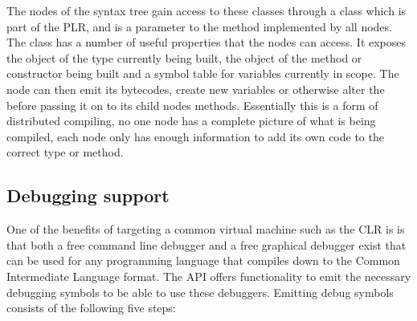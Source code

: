 	The nodes of the syntax tree gain access to these classes through a 
	 class which is part of the PLR, and is a parameter 
	to the  method implemented by all nodes. The 
	 class has a number of useful properties that the 
	nodes can access. It exposes the  object of the type 
	currently being built, the  object of the method or 
	constructor being built and a symbol table for variables currently in scope. 
	The node can then emit its bytecodes, create new variables or otherwise 
	alter the  before passing it on to its child nodes 
	 methods. Essentially this is a form of distributed 
	compiling, no one node has a complete picture of what is being compiled, 
	each node only has enough information to add its own code to the correct 
	type or method.

\subsection{Debugging support}\label{debug_support}
	
	One of the benefits of targeting a common virtual machine such as the CLR is
	is that both a free command line debugger and a free graphical debugger 
	exist that can be used for any programming language that compiles down to 
	the Common Intermediate Language format. The  
	API offers functionality to emit the necessary debugging symbols to be able 
	to use these debuggers. Emitting debug symbols consists of the following 
	five steps:
 	
